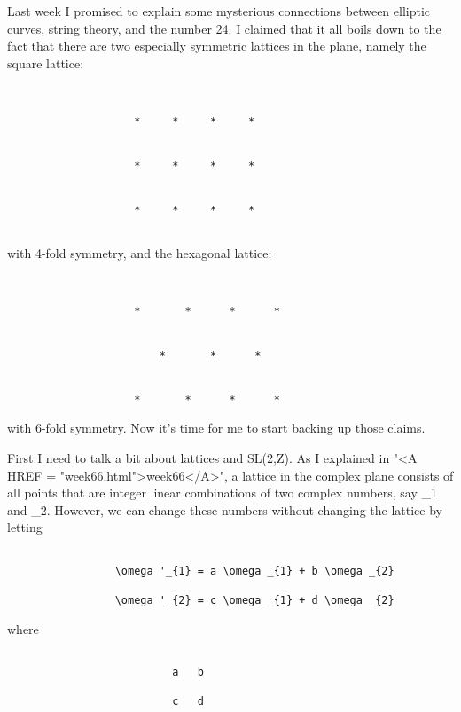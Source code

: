 

Last week I promised to explain some mysterious connections between
elliptic curves, string theory, and the number 24.  I claimed that
it all boils down to the fact that there are two especially symmetric
lattices in the plane, namely the square lattice:



\begin{verbatim}


                    *     *     *     *


                    *     *     *     *


                    *     *     *     *
         
\end{verbatim}
    
with 4-fold symmetry, and the hexagonal lattice:



\begin{verbatim}


                    *       *      *      *


                        *       *      *                


                    *       *      *      *

\end{verbatim}
    

with 6-fold symmetry.  Now it's time for me to start backing up those
claims.  

First I need to talk a bit about lattices and SL(2,Z).  As I explained
in "<A HREF = "week66.html">week66</A>", a lattice in the complex plane consists of all points that
are integer linear combinations of two complex numbers, 
say \omega _{1} and
\omega _{2}.  However, we can change these numbers without 
changing the lattice by letting


\begin{verbatim}

                 \omega '_{1} = a \omega _{1} + b \omega _{2}

                 \omega '_{2} = c \omega _{1} + d \omega _{2}

\end{verbatim}
    
where 

\begin{verbatim}

                          a   b 

                          c   d
\end{verbatim}
    
